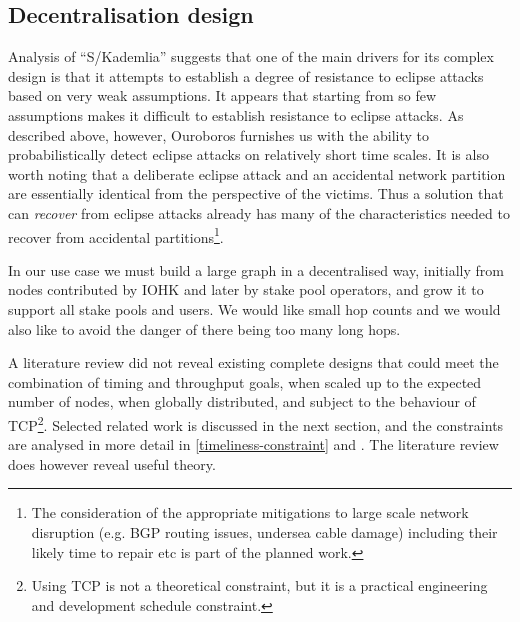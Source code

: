 \documentclass[11pt,a4paper]{article}
\begin{document}
\subsection{Decentralisation design}
\label{decentralisation-design}

Analysis of ``S/Kademlia'' suggests that one of the main drivers for its
complex design is that it attempts to establish a degree of resistance
to eclipse attacks based on very weak assumptions. It appears that
starting from so few assumptions makes it difficult to establish
resistance to eclipse attacks. As described above, however, Ouroboros
furnishes us with the ability to probabilistically detect eclipse
attacks on relatively short time scales. It is also worth noting that a
deliberate eclipse attack and an accidental network partition are
essentially identical from the perspective of the victims. Thus a
solution that can \emph{recover} from eclipse attacks already has many
of the characteristics needed to recover from accidental
partitions\footnote{The consideration of the appropriate mitigations to
  large scale network disruption (e.g. BGP routing issues, undersea
  cable damage) including their likely time to repair etc is part of the
  planned work.}.

In our use case we must build a large graph in a decentralised way,
initially from nodes contributed by IOHK and later by stake pool
operators, and grow it to support all stake pools and users. We would
like small hop counts and we would also like to avoid the danger of
there being too many long hops.

A literature review did not reveal existing complete designs that could
meet the combination of timing and throughput goals, when scaled up to
the expected number of nodes, when globally distributed, and subject to
the behaviour of TCP\footnote{Using TCP is not a theoretical constraint,
  but it is a practical engineering and development schedule constraint.}.
Selected related work is discussed in the next section, and the
constraints are analysed in more detail in
\cref{timeliness-constraint} and
.
The literature review does however reveal useful theory.
\end{document}
